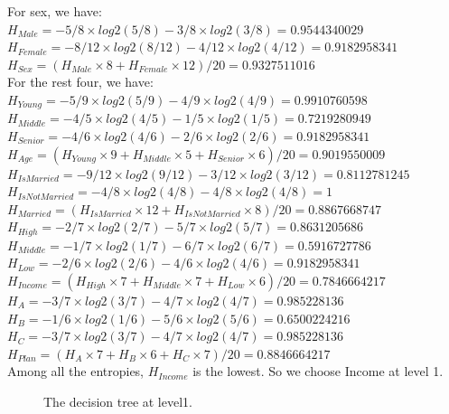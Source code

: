 \documentclass[12pt]{article}
\begin{document}
For sex, we have:\\
$H_{Male} = -5/8 × log2(5/8) - 3/8 × log2(3/8) = 0.9544340029$\\
$H_{Female} = - 8/12 × log2(8/12) - 4/12 × log2(4/12) = 0.9182958341$\\
$H_{Sex} = (H_{Male} × 8 + H_{Female} × 12)/20 = 0.9327511016$\\

For the rest four, we have:\\
$H_{Young} = - 5/9 × log2(5/9) - 4/9 × log2(4/9) = 0.9910760598$\\
$H_{Middle} = - 4/5 × log2(4/5) - 1/5 × log2(1/5) = 0.7219280949$\\
$H_{Senior} = - 4/6 × log2(4/6) - 2/6 × log2(2/6) = 0.9182958341$\\
$H_{Age} = (H_{Young} × 9 + H_{Middle} × 5 + H_{Senior} × 6)/20 = 0.9019550009$\\

$H_{IsMarried} = - 9/12 × log2(9/12) - 3/12 × log2(3/12) = 0.8112781245$\\
$H_{IsNotMarried} = - 4/8 × log2(4/8) - 4/8 × log2(4/8) = 1$\\
$H_{Married} = (H_{IsMarried} × 12 + H_{IsNotMarried} × 8)/20 = 0.8867668747$\\

$H_{High} = -2/7 ×log2(2/7) -5/7 ×log2(5/7) = 0.8631205686$\\
$H_{Middle} = - 1/7 × log2(1/7) - 6/7 × log2(6/7) = 0.5916727786$\\
$H_{Low} = - 2/6 × log2(2/6) - 4/6 × log2(4/6) = 0.9182958341$\\
$H_{Income} = (H_{High} × 7 + H_{Middle} × 7 + H_{Low} × 6)/20 = 0.7846664217$\\

$H_{A} = - 3/7 × log2(3/7) - 4/7 × log2(4/7) = 0.985228136$\\
$H_{B} = - 1/6 × log2(1/6) - 5/6 × log2(5/6) = 0.6500224216$\\
$H_{C} = - 3/7 × log2(3/7) - 4/7 × log2(4/7) = 0.985228136$\\
$H_{Plan} = (H_{A} ×7 + H_{B} × 6+ H_{C} ×7 )/20 = 0.8846664217$\\

Among all the entropies, $H_{Income}$ is the lowest. So we choose Income at level 1.

\begin{figure}[!ht]
\begin{center}
\sf\footnotesize
{}
\end{center}
\caption{The decision tree at level1.}
\label{fig:tree-level1}
\end{figure}
\end{document}
